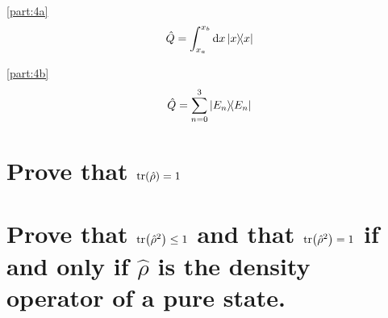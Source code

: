 \documentclass[boxes,pages]{homework}
\makeatletter
\numberwithin{@problem}{section}
\makeatother
\begin{document}
\begin{solution}
	\ref{part:4a}
	\begin{equation*}
		\hat{Q} = \int_{x_a}^{x_b}\dd{x}\ketbra{x}
	\end{equation*}

	\ref{part:4b}
	\begin{equation*}
		\hat{Q} = \sum_{n = 0}^3\ketbra{E_n}
	\end{equation*}
\end{solution}

\setcounter{section}{10}

\begin{problem}
\begin{parts}
	\part{Prove that $\tr(\hat{\rho}) = 1$}\label{part:1a}
	\part{Prove that $\tr(\hat{\rho}^2) \leq 1$ and that $\tr(\hat{\rho}^2) = 1$ if and only if $\hat{\rho}$ is the density operator of a pure state.}\label{part:1b}
\end{parts}
\end{problem}
\end{document}
